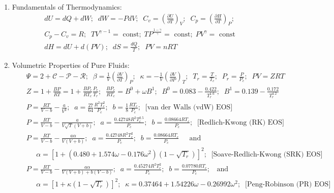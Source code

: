 \documentclass[12pts,a4paper,amsmath,amssymb,floatfix]{article}%
\newcommand{\frc}{\displaystyle\frac}
\newcommand{\Partial}[3][error]{\left(\frc{\partial #1}{\partial #2}\right)_{#3}}
\begin{document}
\begin{enumerate}[1.]
\item Fundamentals of Thermodynamics:
  \begin{eqnarray}
    && dU = dQ + dW;\;\;dW = -PdV;\;\; C_{v}=\Partial[U]{T}{V};\;\;C_{p} = \Partial[H]{T}{P};\nonumber \\
    && C_{p}-C_{v} = R;\;\; TV^{\gamma-1} =\text{ const};\; TP^{\frac{1-\gamma}{\gamma}}=\text{ const};\; PV^{\gamma}=\text{ const} \nonumber \\
    && dH = dU + d(PV);\;\; dS = \frc{dQ}{T};\;\; PV = nRT \nonumber
  \end{eqnarray}
  
  \item Volumetric Properties of Pure Fluids:
  \begin{eqnarray}
    && \Psi = 2 + \mathcal{C} - \mathcal{P} -\mathcal{R};\;\; \beta = \frc{1}{V}\Partial[V]{T}{P};\;\; \kappa = -\frc{1}{V}\Partial[V]{P}{T};\;\;T_{r} = \frc{T}{T_{c}};\;\; P_{r} = \frc{P}{P_{c}};\;\; PV=ZRT \nonumber \\
    &&  Z = 1 + \frc{B P}{R T} = 1 + \frc{B P_{c}}{R T_{c}}\frc{P_{r}}{T_{r}};\;\; \frc{B P_{c}}{R T_{c}} = B^{0} + \omega B^{1};\;\; B^{0} = 0.083 - \frc{0.422}{T_{r}^{1.6}}; \;\; B^{1} = 0.139 - \frc{0.172}{T_{r}^{4.2}} \nonumber \\
    && P = \frc{R T}{V-b} - \frc{a}{V^{2}};\;\;a = \frc{27}{64}\frc{R^{2}T_{c}^{2}}{P_{c}};\;\; b = \frc{1}{8}\frc{R T_{c}}{P_{c}};\;\; \text{[van der Walls (vdW) EOS]} \nonumber \\
    && P = \frc{R T}{V-b} - \frc{a}{V\sqrt{T}\left(V+b\right)};\;\;a = \frc{0.42748 R^{2}T_{c}^{2.5}}{P_{c}};\;\; b = \frc{0.08664 R T_{c} }{P_{c}};\;\;\text{[Redlich-Kwong (RK) EOS]}  \nonumber \\
    && P = \frc{R T}{V-b} - \frc{a\alpha}{V\left(V+b\right)};\;\; a = \frc{0.42748 R^{2}T_{c}^{2}}{P_{c}};\;\; b = \frc{0.08664 R T_{c} }{P_{c}}\;\;\;\;\text{ and } \nonumber \\
    && \;\;\;\;\; \alpha = \left[1 + \left( 0.480 + 1.574\omega - 0.176\omega^{2}\right)\left(1-\sqrt{T_{r}}\right)\right]^{2}; \;\;\text{[Soave-Redlich-Kwong (SRK) EOS]}  \nonumber \\
    && P = \frc{R T}{V-b} - \frc{a\alpha}{V\left(V+b\right)+b\left(V-b\right)};\;\; a = \frc{0.45274 R^{2}T_{c}^{2}}{P_{c}};\;\;b = \frc{0.07780 R T_{c} }{P_{c}};\;\;\text{ and } \nonumber \\
    &&\;\;\;\;\;\alpha = \left[1 + \kappa\left(1-\sqrt{T_{r}}\right)\right]^{2};\;\; \kappa = 0.37464 + 1.54226\omega - 0.26992\omega^{2};\;\; \text{[Peng-Robinson (PR) EOS]}  \nonumber \\

\end{eqnarray}
\end{enumerate}
\end{document}
